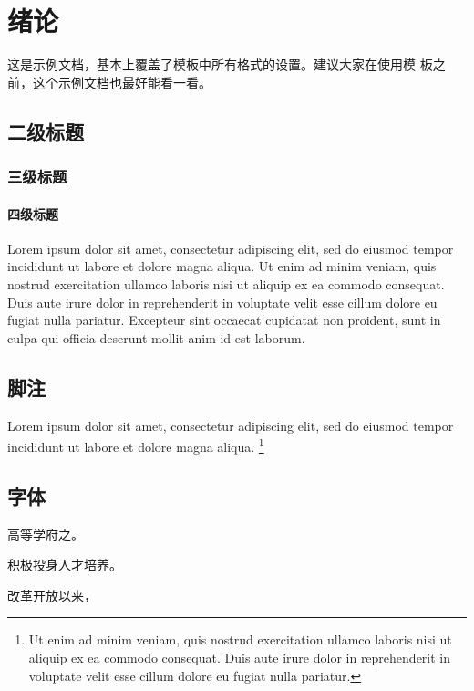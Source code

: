 
\chapter{绪论}


这是示例文档，基本上覆盖了模板中所有格式的设置。建议大家在使用模
板之前，这个示例文档也最好能看一看。

\section{二级标题}

\subsection{三级标题}

\subsubsection{四级标题}

Lorem ipsum dolor sit amet, consectetur adipiscing elit, sed do eiusmod tempor
incididunt ut labore et dolore magna aliqua. Ut enim ad minim veniam, quis
nostrud exercitation ullamco laboris nisi ut aliquip ex ea commodo consequat.
Duis aute irure dolor in reprehenderit in voluptate velit esse cillum dolore eu
fugiat nulla pariatur. Excepteur sint occaecat cupidatat non proident, sunt in
culpa qui officia deserunt mollit anim id est laborum.

\section{脚注}

Lorem ipsum dolor sit amet, consectetur adipiscing elit, sed do eiusmod tempor
incididunt ut labore et dolore magna aliqua. \footnote{Ut enim ad minim veniam,
quis nostrud exercitation ullamco laboris nisi ut aliquip ex ea commodo
consequat. Duis aute irure dolor in reprehenderit in voluptate velit esse cillum
dolore eu fugiat nulla pariatur.}

\section{字体}


高等学府之。 

{\songti 积极投身人才培养。}

{\heiti 改革开放以来，}

